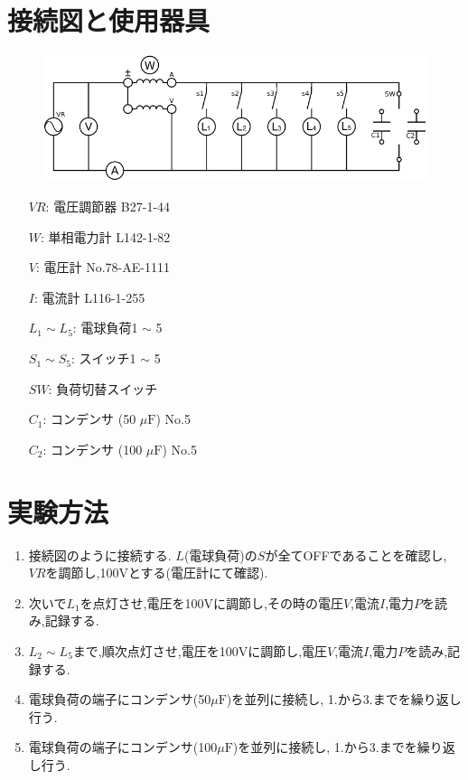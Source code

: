 \documentclass[uplatex]{jsarticle}
\begin{document}
    \section{接続図と使用器具}
        \begin{figure}[h]
            \centering
            \includegraphics{1.pdf}
        \end{figure}
        \begin{minipage}{0.5\hsize}
            \begin{itemize}
                \item[$VR$:]電圧調節器 B27-1-44
                \item[$W$:]単相電力計 L142-1-82
                \item[$V$:]電圧計 No.78-AE-1111
                \item[$I$:]電流計 L116-1-255
            \end{itemize}
        \end{minipage}
        \begin{minipage}{0.5\hsize}
            \begin{itemize}
                \item[$L_{1} \sim L_{5}$:]電球負荷1 $\sim$ 5
                \item[$S_{1} \sim S_{5}$:]スイッチ1 $\sim$ 5
                \item[$SW$:]負荷切替スイッチ
                \item[$C_{1}$:]コンデンサ (50 $\mu \mathrm F$) No.5
                \item[$C_{2}$:]コンデンサ (100 $\mu \mathrm F$) No.5
            \end{itemize}
        \end{minipage}
    \section{実験方法}
        \begin{enumerate}
            \item 接続図のように接続する. $L$(電球負荷)の$S$が全てOFFであることを確認し, $VR$を調節し,100Vとする(電圧計にて確認).
            \item 次いで$L_{1}$を点灯させ,電圧を100Vに調節し,その時の電圧$V$,電流$I$,電力$P$を読み,記録する.
            \item $L_{2} \sim L_{5}$まで,順次点灯させ,電圧を100Vに調節し,電圧$V$,電流$I$,電力$P$を読み,記録する.
            \item 電球負荷の端子にコンデンサ(50$\mu \mathrm F$)を並列に接続し,  1.から3.までを繰り返し行う.
            \item 電球負荷の端子にコンデンサ(100$\mu \mathrm F$)を並列に接続し, 1.から3.までを繰り返し行う.
        \end{enumerate}
    \newpage
\end{document}
